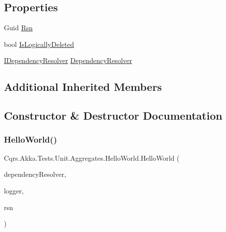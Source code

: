 \subsection*{Properties}
\begin{DoxyCompactItemize}
\item 
Guid \hyperlink{classCqrs_1_1Akka_1_1Tests_1_1Unit_1_1Aggregates_1_1HelloWorld_a2e74fa47e00d67d6de3df5b1b8e140f6_a2e74fa47e00d67d6de3df5b1b8e140f6}{Rsn}
\item 
bool \hyperlink{classCqrs_1_1Akka_1_1Tests_1_1Unit_1_1Aggregates_1_1HelloWorld_acd17d8097c0cb44400e876a53b4fbd57_acd17d8097c0cb44400e876a53b4fbd57}{Is\+Logically\+Deleted}
\item 
\hyperlink{interfaceCqrs_1_1Configuration_1_1IDependencyResolver}{I\+Dependency\+Resolver} \hyperlink{classCqrs_1_1Akka_1_1Tests_1_1Unit_1_1Aggregates_1_1HelloWorld_abf66c1d14c78b9ed3ca54225d04a8beb_abf66c1d14c78b9ed3ca54225d04a8beb}{Dependency\+Resolver}
\end{DoxyCompactItemize}
\subsection*{Additional Inherited Members}


\subsection{Constructor \& Destructor Documentation}
\mbox{\label{classCqrs_1_1Akka_1_1Tests_1_1Unit_1_1Aggregates_1_1HelloWorld_a54c9de656ea141ad532d55ba33e94a56_a54c9de656ea141ad532d55ba33e94a56}} 
\subsubsection{\texorpdfstring{Hello\+World()}{HelloWorld()}}
{\footnotesize\ttfamily Cqrs.\+Akka.\+Tests.\+Unit.\+Aggregates.\+Hello\+World.\+Hello\+World (\begin{DoxyParamCaption}\item[{\hyperlink{interfaceCqrs_1_1Configuration_1_1IDependencyResolver}{I\+Dependency\+Resolver}}]{dependency\+Resolver,  }\item[{I\+Logger}]{logger,  }\item[{Guid}]{rsn }\end{DoxyParamCaption})}



